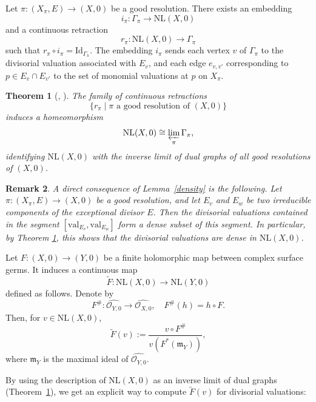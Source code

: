\documentclass[reqno,dvipsnames,12pt]{amsart}
\newtheorem{thm}{Theorem}[section]
\newtheorem{rema}[thm]{Remark}
\begin{document}
Let $\pi:(X_\pi,E) \longrightarrow (X,0)$ be a good resolution. There exists an embedding
\[
i_\pi : \Gamma_\pi \longrightarrow \mathrm{NL}(X,0)
\]
and a continuous retraction
\[
r_\pi : \mathrm{NL}(X,0) \longrightarrow \Gamma_\pi
\]
such that $r_\pi \circ i_\pi = \mathrm{Id}_{\Gamma_\pi}$. The embedding $i_\pi$ sends each vertex $v$ of $\Gamma_\pi$ to the divisorial valuation associated with $E_v$, and each edge $e_{v,v'}$ corresponding to $p \in E_v \cap E_{v'}$ to the set of monomial valuations at $p$ on $X_\pi$.

\begin{thm}[{\cite[Theorem 2.27]{GignacRuggiero2017}, \cite[Theorem 7.9]{Jonsson2015}}]\label{universaldualgraph}
The family of continuous retractions $$\{r_\pi \mid \pi \text{ a good resolution of } (X,0)\}$$ induces a homeomorphism
\[
\mathrm{NL}(X,0) \cong \varprojlim_\pi \Gamma_\pi,
\]
identifying $\mathrm{NL}(X,0)$ with the inverse limit of dual graphs of all good resolutions of $(X,0)$.
\end{thm}
\begin{rema}\label{densiteremarque}
A direct consequence of Lemma~\ref{density} is the following. Let
$\pi:(X_{\pi},E)\longrightarrow (X,0)$ be a good resolution, and let $E_v$ and $E_w$ be two irreducible components of the exceptional divisor $E$. Then the divisorial valuations contained in the segment
$[\mathrm{val}_{E_v},\mathrm{val}_{E_w}]$ form a dense subset of this segment. In particular, by Theorem \ref{universaldualgraph}, this shows that the divisorial valuations are dense in $\mathrm{NL}(X,0)$.
\end{rema}
Let $F:(X,0) \to (Y,0)$ be a finite holomorphic map between complex surface germs. It induces a continuous map
\[
\widetilde{F}: \mathrm{NL}(X,0) \longrightarrow \mathrm{NL}(Y,0)
\]
defined as follows. Denote by
\[
F^\# : \widehat{\mathcal{O}_{Y,0}} \longrightarrow \widehat{\mathcal{O}_{X,0}}, \quad F^\#(h) = h \circ F.
\]
Then, for $v \in \mathrm{NL}(X,0)$,
\begin{equation}\label{inducedmap}
\widetilde{F}(v) := \frac{v \circ F^\#}{v(F^*(\mathfrak{m}_Y))},
\end{equation}
where $\mathfrak{m}_Y$ is the maximal ideal of $\widehat{\mathcal{O}_{Y,0}}$.

By using the description of $\mathrm{NL}(X,0)$ as an inverse limit of dual graphs (Theorem~\ref{universaldualgraph}), we get an explicit way to compute $\widetilde{F}(v)$ for divisorial valuations:
\end{document}
